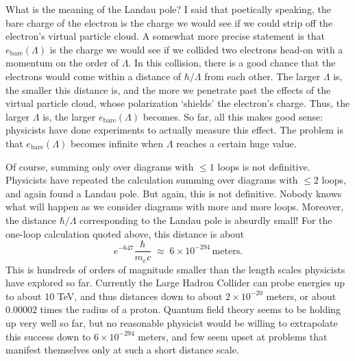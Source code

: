 \documentclass{article}
\newcommand{\bare}{\mathrm{bare}}
\begin{document}
What is the meaning of the Landau pole?  I said that poetically speaking, the bare charge of the electron is the charge we would see if we could strip off the electron's virtual particle cloud.  A somewhat more precise statement is that $e_\bare(\Lambda)$ is the charge we would see if we collided two electrons head-on with a momentum on the order of $\Lambda$.  In this collision, there is a good chance that the electrons would come within a distance of $\hbar/\Lambda$ from each other.  The larger $\Lambda$ is, the smaller this distance is, and the more we penetrate past the effects of the virtual particle cloud, whose polarization `shields' the electron's charge. Thus, the larger $\Lambda$ is, the larger $e_\bare(\Lambda)$ becomes.  So far, all this makes good sense: physicists have done experiments to actually measure this effect.  The problem is that $e_\bare(\Lambda)$ becomes infinite when $\Lambda$ reaches a certain huge value. 

Of course, summing only over diagrams with $\le 1$ loops is not definitive.  Physicists have repeated the calculation summing over diagrams with $\le 2$ loops, and again found a Landau pole.  But again, this is not definitive.  Nobody knows what will happen as we consider diagrams with more and more loops.  Moreover, the distance $\hbar/\Lambda$ corresponding to the Landau pole is absurdly small!  For the one-loop calculation quoted above, 
this distance is about 
\[       e^{-647} \frac{\hbar}{m_e c} \; \approx \;  6 \times 10^{-294}\, \mathrm{meters} .\]
This is hundreds of orders of magnitude smaller than the length scales physicists have explored so far.  Currently the Large Hadron Collider can probe energies up to about 10 TeV, and thus distances down to about $2 \times 10^{-20}$ meters, or about 0.00002 times the radius of a proton.  Quantum field theory seems to be holding up very well so far, but no reasonable physicist would be willing to extrapolate this success down to $6 \times 10^{-294}$ meters, and few seem upset at problems that manifest themselves only at such a short distance scale.  
\end{document}
